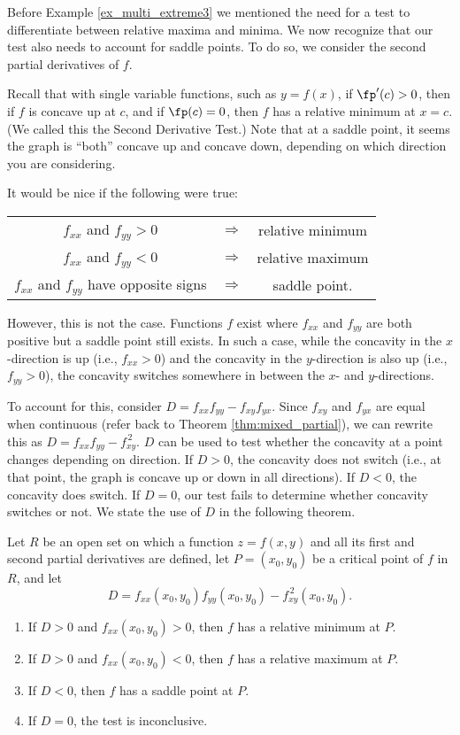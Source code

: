 Before Example \ref{ex_multi_extreme3} we mentioned the need for a test to differentiate between relative maxima and minima. We now recognize that our test also needs to account for saddle points. To do so, we consider the second partial derivatives of $f$.

Recall that with single variable functions, such as $y=f(x)$, if $\fp'(c)>0$, then if $f$ is concave up at $c$, and if $\fp(c) =0$, then $f$ has a relative minimum at $x=c$. (We called this the Second Derivative Test.) Note that at a saddle point, it seems the graph is ``both'' concave up and concave down, depending on which direction you are considering.

It would be nice if the following were true:
\begin{center}
	\begin{tabular}{ccc}
	$f_{xx}$ and $f_{yy} >0$ & $\Rightarrow$ & relative minimum\\
	$f_{xx}$ and $f_{yy} <0$ & $\Rightarrow$ & relative maximum\\
	$f_{xx}$ and $f_{yy}$ have opposite signs & $\Rightarrow$ & saddle point.
	\end{tabular}
\end{center}

However, this is not the case. Functions $f$ exist where $f_{xx}$ and $f_{yy}$ are both positive  but a saddle point still exists. In such a case, while the concavity in the $x$-direction is up (i.e., $f_{xx}>0$) and the concavity in the $y$-direction is also up (i.e., $f_{yy}>0$), the concavity switches somewhere in between the $x$- and $y$-directions.

To account for this, consider $D = f_{xx}f_{yy}-f_{xy}f_{yx}$. Since $f_{xy}$ and $f_{yx}$ are equal when continuous (refer back to Theorem \ref{thm:mixed_partial}), we can rewrite this as $D = f_{xx}f_{yy}-f_{xy}^{\,2}$. $D$ can be used to test whether the concavity at a point changes depending on direction. If $D>0$, the concavity does not switch (i.e., at that point, the graph is concave up or down in all directions). If $D<0$, the concavity does switch. If $D=0$, our test fails to determine whether concavity switches or not. We state the use of $D$ in the following theorem.

{Let $R$ be an open set on which a function $z=f(x,y)$ and all its first and second partial derivatives are defined, let $P = (x_0,y_0)$ be a critical point of $f$ in $R$, and let 
$$D = f_{xx}(x_0,y_0)f_{yy}(x_0,y_0)-f_{xy}^{\,2}(x_0,y_0).$$
\begin{enumerate}
	\item If $D>0$ and $f_{xx}(x_0,y_0)>0$, then $f$ has a relative minimum at $P$.
	\item If $D>0$ and $f_{xx}(x_0,y_0)<0$, then $f$ has a relative maximum at $P$.
	\item	If $D<0$, then $f$ has a saddle point at $P$.
	\item If $D=0$, the test is inconclusive.
\end{enumerate}
}

